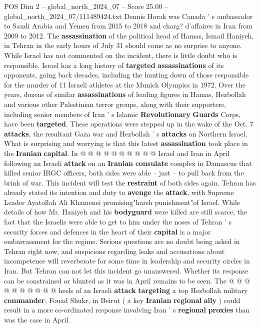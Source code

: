 \begin{textsample}{POS Dim 2 – global\_north\_2024\_07 – Score 25.00 – global\_north\_2024\_07/111489424.txt}  \label{ex:f2_pos_185}
Dennis Horak was Canada ' s ambassador to Saudi Arabia and Yemen from 2015 to 2018 and charg? d'affaires in Iran from 2009 to 2012.
The \textbf{assassination} of the political head of Hamas, Ismail Haniyeh, in Tehran in the early hours of July 31 should come as no surprise to anyone.
While Israel has not commented on the incident, there is little doubt who is responsible.
Israel has a long history of \textbf{targeted} \textbf{assassinations} of its opponents, going back decades, including the hunting down of those responsible for the murder of 11 Israeli athletes at the Munich Olympics in 1972.
Over the years, dozens of similar \textbf{assassinations} of leading figures in Hamas, Hezbollah and various other Palestinian terror groups, along with their supporters, including senior members of Iran ' s Islamic \textbf{Revolutionary} \textbf{Guards} Corps, have been \textbf{targeted}.
These operations were stepped up in the wake of the Oct. 7 \textbf{attacks}, the resultant Gaza war and Hezbollah ' s \textbf{attacks} on Northern Israel.
What is surprising and worrying is that this latest \textbf{assassination} took place in the \textbf{Iranian} \textbf{capital}.
In @ @ @ @ @ @ @ @ @ @ Israel and Iran in April following an Israeli \textbf{attack} on an \textbf{Iranian} \textbf{consulate} complex in Damascus that killed senior IRGC officers, both sides were able -- just -- to pull back from the brink of war.
This incident will test the \textbf{restraint} of both sides again.
Tehran has already stated its intention and duty to \textbf{avenge} the \textbf{attack}, with Supreme Leader Ayatollah Ali Khamenei promising"harsh punishment"of Israel.
While details of how Mr.
Haniyeh and his \textbf{bodyguard} were killed are still scarce, the fact that the Israelis were able to get to him under the noses of Tehran ' s security forces and defences in the heart of their \textbf{capital} is a major embarrassment for the regime.
Serious questions are no doubt being asked in Tehran right now, and suspicions regarding leaks and accusations about incompetence will reverberate for some time in leadership and security circles in Iran.
But Tehran can not let this incident go unanswered.
Whether its response can be constrained or blunted as it was in April remains to be seen.
The @ @ @ @ @ @ @ @ @ @ heels of an Israeli \textbf{attack} \textbf{targeting} a top Hezbollah military \textbf{commander}, Fouad Shukr, in Beirut ( a key \textbf{Iranian} \textbf{regional} \textbf{ally} ) could result in a more co-ordinated response involving Iran ' s \textbf{regional} \textbf{proxies} than was the case in April.

\end{textsample}
